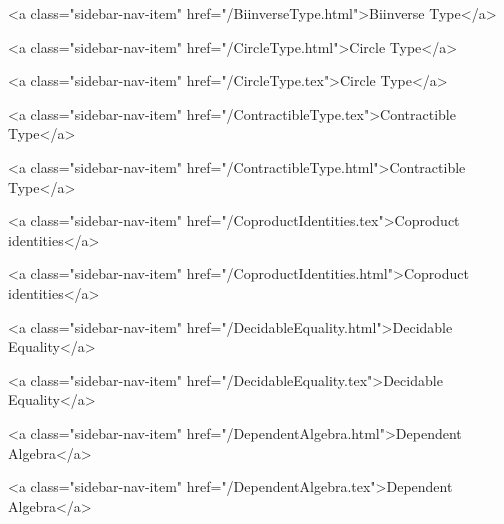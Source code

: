       
    
      
        
          <a class="sidebar-nav-item" href="/BiinverseType.html">Biinverse Type</a>
        
      
    
      
        
          <a class="sidebar-nav-item" href="/CircleType.html">Circle Type</a>
        
      
    
      
        
          <a class="sidebar-nav-item" href="/CircleType.tex">Circle Type</a>
        
      
    
      
        
          <a class="sidebar-nav-item" href="/ContractibleType.tex">Contractible Type</a>
        
      
    
      
        
          <a class="sidebar-nav-item" href="/ContractibleType.html">Contractible Type</a>
        
      
    
      
        
          <a class="sidebar-nav-item" href="/CoproductIdentities.tex">Coproduct identities</a>
        
      
    
      
        
          <a class="sidebar-nav-item" href="/CoproductIdentities.html">Coproduct identities</a>
        
      
    
      
        
          <a class="sidebar-nav-item" href="/DecidableEquality.html">Decidable Equality</a>
        
      
    
      
        
          <a class="sidebar-nav-item" href="/DecidableEquality.tex">Decidable Equality</a>
        
      
    
      
        
          <a class="sidebar-nav-item" href="/DependentAlgebra.html">Dependent Algebra</a>
        
      
    
      
        
          <a class="sidebar-nav-item" href="/DependentAlgebra.tex">Dependent Algebra</a>
        

